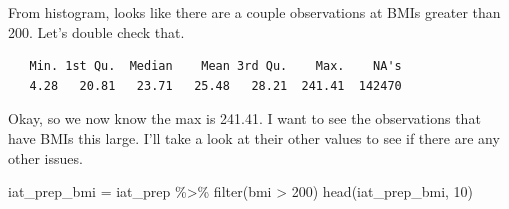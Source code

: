 \documentclass[
  letterpaper,
  DIV=11,
  numbers=noendperiod]{scrartcl}
\newenvironment{Shaded}{\begin{snugshade}}{\end{snugshade}}
\newcommand{\DecValTok}[1]{\textcolor[rgb]{0.68,0.00,0.00}{#1}}
\newcommand{\FunctionTok}[1]{\textcolor[rgb]{0.28,0.35,0.67}{#1}}
\newcommand{\NormalTok}[1]{\textcolor[rgb]{0.00,0.23,0.31}{#1}}
\newcommand{\OtherTok}[1]{\textcolor[rgb]{0.00,0.23,0.31}{#1}}
\newcommand{\SpecialCharTok}[1]{\textcolor[rgb]{0.37,0.37,0.37}{#1}}
\begin{document}
From histogram, looks like there are a couple observations at BMIs
greater than 200. Let's double check that.

\begin{Shaded}
\end{Shaded}

\begin{verbatim}
   Min. 1st Qu.  Median    Mean 3rd Qu.    Max.    NA's 
   4.28   20.81   23.71   25.48   28.21  241.41  142470 
\end{verbatim}

Okay, so we now know the max is 241.41. I want to see the observations
that have BMIs this large. I'll take a look at their other values to see
if there are any other issues.

\begin{Shaded}
\begin{Highlighting}[]
\NormalTok{iat\_prep\_bmi }\OtherTok{=}\NormalTok{ iat\_prep }\SpecialCharTok{\%\textgreater{}\%} \FunctionTok{filter}\NormalTok{(bmi }\SpecialCharTok{\textgreater{}} \DecValTok{200}\NormalTok{)}
\FunctionTok{head}\NormalTok{(iat\_prep\_bmi, }\DecValTok{10}\NormalTok{)}
\end{Highlighting}
\end{Shaded}
\end{document}
